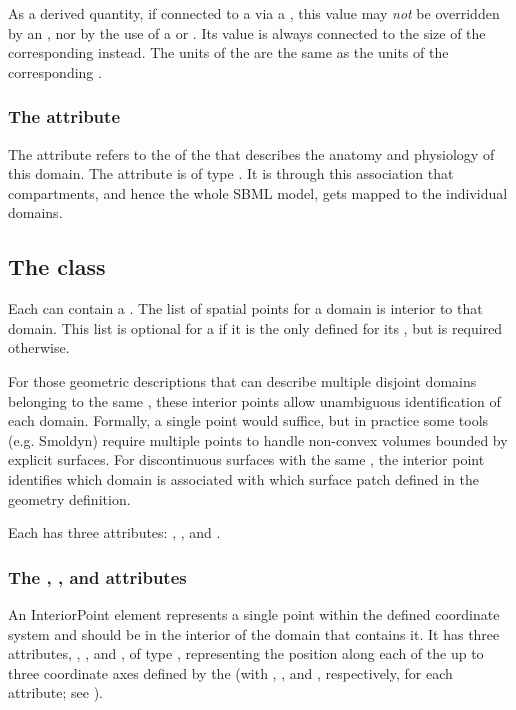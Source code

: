 As a derived quantity, if connected to a \Parameter via a \SpatialSymbolReference, this value may \emph{not} be overridden by an \InitialAssignment, nor by the use of a \Rule or \Event.  Its value is always connected to the size of the corresponding \Geometry instead.  The units of the \Domain are the same as the units of the corresponding \DomainType.

\subsubsection{The \fixttspace{} attribute}
The  attribute refers to the  of the \DomainType that describes the anatomy and physiology of this domain. The attribute is of type . It is through this association that compartments, and hence the whole SBML model, gets mapped to the individual domains. 


\subsection{The  class}
\label{interiorpoint-class}
Each \Domain can contain a \ListOfInteriorPoints. The list of spatial points for a domain is interior to that domain.  This list is optional for a \Domain if it is the only \Domain defined for its \DomainType, but is required otherwise.

For those geometric descriptions that can describe multiple disjoint domains belonging to the same , these interior points allow unambiguous identification of each domain.  Formally, a single point would suffice, but in practice some tools (e.g. Smoldyn) require multiple points to handle non-convex volumes bounded by explicit surfaces.  For discontinuous surfaces with the same , the interior point identifies which domain is associated with which surface patch defined in the geometry definition.

Each \InteriorPoint has three attributes: , , and . 

\subsubsection{The \fixttspace{}, , and  attributes}
An InteriorPoint element represents a single point within the defined coordinate system and should be in the interior of the domain that contains it. It has three attributes, , , and , of type , representing the position along each of the up to three coordinate axes defined by the \CoordinateComponents (with  , , and , respectively, for each  attribute; see ).


